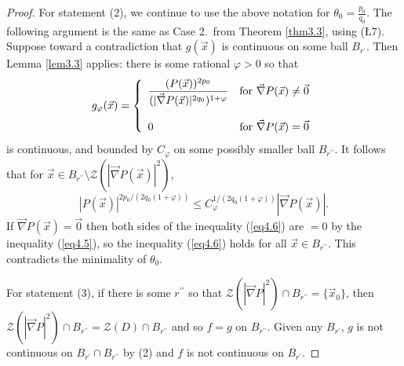 \documentclass[12pt]{amsart}
\theoremstyle{definition}
\theoremstyle{remark}
\numberwithin{equation}{section}
\newcommand{\vv}{\mathcal{Z}}
\begin{document}
\begin{proof}
For statement (2), we continue to use the above notation for $\displaystyle{\theta_0=\frac{p_0}{q_0}}$.  The following argument is the same as Case 2.\ from Theorem \ref{thm3.3}, using (\L7).  Suppose toward a contradiction that $g(\vec x)$ is continuous on some ball $B_{r^{\prime}}$.  Then Lemma \ref{lem3.3} applies: there is some rational $\varphi>0$ so that 
$$g_{\varphi}(\vec x)=\left\{\begin{array}{ll}{\displaystyle{\frac{(P(\vec x))^{2p_0}}{(|\vec\nabla P(\vec x)|^{2q_0})^{1+\varphi}}}} & \mbox{\rm{for} $\vec\nabla P(\vec x)\ne\vec0$}\\ & \\0& \mbox{\rm{for} $\vec\nabla P(\vec x)=\vec0$} \end{array}\right.$$
is continuous, and bounded by $C_\varphi$ on some possibly smaller ball $B_{r^{\prime\prime}}$.
It follows that for $\vec x\in B_{r^{\prime\prime}}\setminus\vv(|\vec\nabla P(\vec x)|^2)$, 
\begin{equation}\label{eq4.6}
|P(\vec x)|^{2p_0/(2q_0(1+\varphi))}\le C_\varphi^{1/(2q_0(1+\varphi))}|\vec\nabla P(\vec x)|.
\end{equation}
If $\vec\nabla P(\vec x)=\vec0$ then both sides of the inequality (\ref{eq4.6}) are $=0$ by the inequality (\ref{eq4.5}), so the inequality (\ref{eq4.6}) holds for all $\vec x\in B_{r^{\prime\prime}}$.  This contradicts the minimality of $\theta_0$.

For statement (3), if there is some $r^{\prime\prime}$ so that $\vv(|\vec\nabla P|^2)\cap B_{r^{\prime\prime}}=\{\vec x_0\}$, then $\vv(|\vec\nabla P|^2)\cap B_{r^{\prime\prime}}=\vv(D)\cap B_{r^{\prime\prime}}$ and so $f=g$ on $B_{r^{\prime\prime}}$.  Given any $B_{r^\prime}$, $g$ is not continuous on $B_{r^\prime}\cap B_{r^{\prime\prime}}$ by (2) and $f$ is not continuous on $B_{r^\prime}$. 
%
%    
\end{proof}
\end{document}
